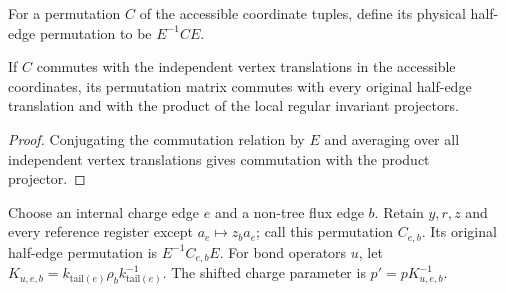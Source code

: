 \begin{definition}
    \label{def:peps_regular_coordinate_physical_permutation}
    \leanok
    For a permutation $C$ of the accessible coordinate tuples, define its
    physical half-edge permutation to be $E^{-1}CE$.
\end{definition}

\begin{lemma}
    \label{thm:peps_regular_coordinate_permutation_support}
    \leanok
    If $C$ commutes with the independent vertex translations in the
    accessible coordinates, its permutation matrix commutes with every
    original half-edge translation and with the product
    of the local regular invariant projectors.
\end{lemma}
\begin{proof}\leanok
    Conjugating the commutation relation by $E$ and averaging over all independent
    vertex translations gives commutation with the product projector.
\end{proof}

\begin{definition}
    \label{def:peps_regular_charge_flux_coordinate_permutation}
    \leanok
    Choose an internal charge edge $e$ and a non-tree flux edge $b$.
    Retain $y,r,z$ and every reference register except
    $a_e\mapsto z_ba_e$; call this permutation $C_{e,b}$.
    Its original half-edge permutation is $E^{-1}C_{e,b}E$.
    For bond operators $u$, let
    $K_{u,e,b}=k_{\mathrm{tail}(e)}\rho_bk_{\mathrm{tail}(e)}^{-1}$.
    The shifted charge parameter is $p'=pK_{u,e,b}^{-1}$.
\end{definition}

